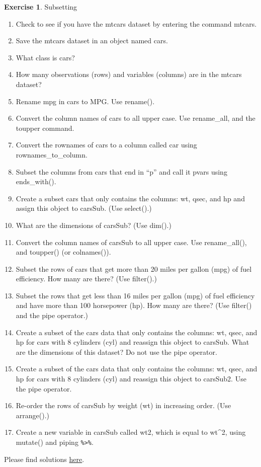 \documentclass[
  12pt,
  oneside]{book}
\providecommand{\tightlist}{%
  \setlength{\itemsep}{0pt}\setlength{\parskip}{0pt}}
\theoremstyle{definition}
\theoremstyle{definition}
\theoremstyle{definition}
\newtheorem{exercise}{Exercise}[chapter]
\theoremstyle{definition}
\theoremstyle{remark}
\begin{document}
\begin{exercise}
\protect\hypertarget{exr:subsetting}{}\label{exr:subsetting}Subsetting

\begin{enumerate}
\def\labelenumi{\arabic{enumi}.}
\tightlist
\item
  Check to see if you have the mtcars dataset by entering the command mtcars.
\item
  Save the mtcars dataset in an object named cars.
\item
  What class is cars?
\item
  How many observations (rows) and variables (columns) are in the mtcars dataset?
\item
  Rename mpg in cars to MPG. Use rename().
\item
  Convert the column names of cars to all upper case. Use rename\_all, and the toupper command.
\item
  Convert the rownames of cars to a column called car using rownames\_to\_column.
\item
  Subset the columns from cars that end in ``p'' and call it pvars using ends\_with().
\item
  Create a subset cars that only contains the columns: wt, qsec, and hp and assign this object to carsSub. (Use select().)
\item
  What are the dimensions of carsSub? (Use dim().)
\item
  Convert the column names of carsSub to all upper case. Use rename\_all(), and toupper() (or colnames()).
\item
  Subset the rows of cars that get more than 20 miles per gallon (mpg) of fuel efficiency. How many are there? (Use filter().)
\item
  Subset the rows that get less than 16 miles per gallon (mpg) of fuel efficiency and have more than 100 horsepower (hp). How many are there? (Use filter() and the pipe operator.)
\item
  Create a subset of the cars data that only contains the columns: wt, qsec, and hp for cars with 8 cylinders (cyl) and reassign this object to carsSub. What are the dimensions of this dataset? Do not use the pipe operator.
\item
  Create a subset of the cars data that only contains the columns: wt, qsec, and hp for cars with 8 cylinders (cyl) and reassign this object to carsSub2. Use the pipe operator.
\item
  Re-order the rows of carsSub by weight (wt) in increasing order. (Use arrange().)
\item
  Create a new variable in carsSub called wt2, which is equal to wt\^{}2, using mutate() and piping \texttt{\%\textgreater{}\%}.
\end{enumerate}

Please find solutions \href{https://raw.githubusercontent.com/hubchev/courses/main/scr/exe_subset.R}{here}.
\end{exercise}
\end{document}
